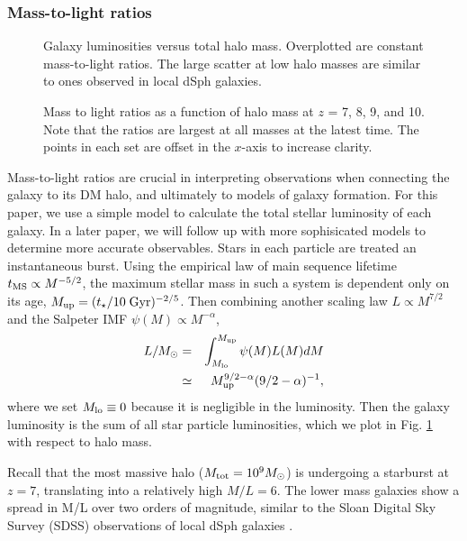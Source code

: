 \documentclass[useAMS,usenatbib]{mn2e}
\begin{document}
\subsubsection{Mass-to-light ratios}
\label{sec:mlratios}

\begin{figure}
  \caption{\label{fig:Lstar} Galaxy luminosities versus total halo
    mass.  Overplotted are constant mass-to-light ratios.  The large
    scatter at low halo masses are similar to ones observed in local
    dSph galaxies.}
\end{figure}

\begin{figure}
  \caption{\label{fig:ML} Mass to light ratios as a function of halo
    mass at $z$ = 7, 8, 9, and 10.  Note that the ratios are largest
    at all masses at the latest time.  The points in each set are
    offset in the $x$-axis to increase clarity.}
\end{figure}

Mass-to-light ratios are crucial in interpreting observations when
connecting the galaxy to its DM halo, and ultimately to models of
galaxy formation.  For this paper, we use a simple model to calculate
the total stellar luminosity of each galaxy.  In a later paper, we
will follow up with more sophisicated models to determine more
accurate observables.  Stars in each particle are treated an
instantaneous burst.  Using the empirical law of main sequence
lifetime $t_{\rm MS} \propto M^{-5/2}$, the maximum stellar mass in
such a system is dependent only on its age, $M_{\rm up} = (t_\star /
10\;\mathrm{Gyr})^{-2/5}$.  Then combining another scaling law $L
\propto M^{7/2}$ and the Salpeter IMF $\psi(M) \propto M^{-\alpha}$,
%
\begin{eqnarray}
  \label{eqn:lum}
  L/M_\odot &=& \int_{M_{\rm lo}}^{M_{\rm up}} \psi(M) L(M) dM \nonumber\\
      &\simeq& M_{\rm up}^{9/2-\alpha} (9/2 - \alpha)^{-1},
\end{eqnarray}
where we set $M_{\rm lo} \equiv 0$ because it is negligible in the
luminosity.  Then the galaxy luminosity is the sum of all star
particle luminosities, which we plot in Fig. \ref{fig:Lstar} with
respect to halo mass.  

Recall that the most massive halo ($M_{\rm tot} = 10^9 \Ms$) is
undergoing a starburst at $z=7$, translating into a relatively high
$M/L = 6$.  The lower mass galaxies show a spread in M/L over two
orders of magnitude, similar to the Sloan Digital Sky Survey (SDSS)
observations of local dSph galaxies \citep[e.g.][]{Strigari08}.  
\end{document}
